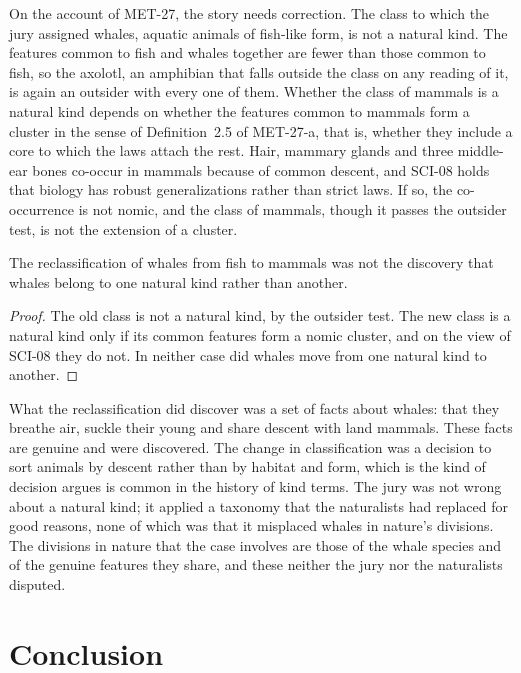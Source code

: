 \documentclass{situationist-preprint}
\begin{document}
On the account of MET-27, the story needs correction. The class to which the jury assigned whales, aquatic animals of fish-like form, is not a natural kind. The features common to fish and whales together are fewer than those common to fish, so the axolotl, an amphibian that falls outside the class on any reading of it, is again an outsider with every one of them. Whether the class of mammals is a natural kind depends on whether the features common to mammals form a cluster in the sense of Definition~2.5 of MET-27-a, that is, whether they include a core to which the laws attach the rest. Hair, mammary glands and three middle-ear bones co-occur in mammals because of common descent, and SCI-08 holds that biology has robust generalizations rather than strict laws. If so, the co-occurrence is not nomic, and the class of mammals, though it passes the outsider test, is not the extension of a cluster.

\begin{proposition}\label{p:whales}
The reclassification of whales from fish to mammals was not the discovery that whales belong to one natural kind rather than another.
\end{proposition}

\begin{proof}
The old class is not a natural kind, by the outsider test. The new class is a natural kind only if its common features form a nomic cluster, and on the view of SCI-08 they do not. In neither case did whales move from one natural kind to another.
\end{proof}

What the reclassification did discover was a set of facts about whales: that they breathe air, suckle their young and share descent with land mammals. These facts are genuine and were discovered. The change in classification was a decision to sort animals by descent rather than by habitat and form, which is the kind of decision \citet{LaPorte2004} argues is common in the history of kind terms. The jury was not wrong about a natural kind; it applied a taxonomy that the naturalists had replaced for good reasons, none of which was that it misplaced whales in nature's divisions. The divisions in nature that the case involves are those of the whale species and of the genuine features they share, and these neither the jury nor the naturalists disputed.

\section{Conclusion}
\end{document}
